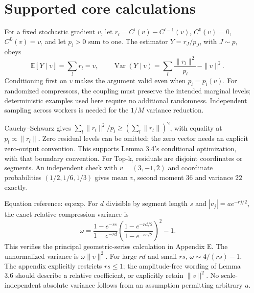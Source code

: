 \documentclass[10pt]{article}
\begin{document}
\section*{Supported core calculations}
For a fixed stochastic gradient \(v\), let \(r_l=C^l(v)-C^{l-1}(v)\), \(C^0(v)=0\), \(C^L(v)=v\), and let \(p_l>0\) sum to one. The estimator \(Y=r_J/p_J\), with \(J\sim p\), obeys \[\mathbb E[Y\mid v]=\sum_l r_l=v,\qquad
 \operatorname{Var}(Y\mid v)=\sum_l\frac{\|r_l\|^2}{p_l}-\|v\|^2.\] Conditioning first on \(v\) makes the argument valid even when \(p_l=p_l(v)\). For randomized compressors, the coupling must preserve the intended marginal levels; deterministic examples used here require no additional randomness. Independent sampling across workers is needed for the \(1/M\) variance reduction.\par
Cauchy–Schwarz gives \(\sum_l\|r_l\|^2/p_l\geq(\sum_l\|r_l\|)^2\), with equality at \(p_l\propto\|r_l\|\). Zero residual levels can be omitted; the zero vector needs an explicit zero-output convention. This supports Lemma 3.4’s conditional optimization, with that boundary convention. For Top-k, residuals are disjoint coordinates or segments. An independent check with \(v=(3,-1,2)\) and coordinate probabilities \((1/2,1/6,1/3)\) gives mean \(v\), second moment \(36\) and variance \(22\) exactly.\par
Equation reference: eq:exp. For \(d\) divisible by segment length \(s\) and \(|v_j|=a e^{-rj/2}\), the exact relative compression variance is \[
 \omega=\frac{1-e^{-rs}}{1-e^{-rd}}
 \left(\frac{1-e^{-rd/2}}{1-e^{-rs/2}}\right)^2-1.\] This verifies the principal geometric-series calculation in Appendix E. The unnormalized variance is \(\omega\|v\|^2\). For large \(rd\) and small \(rs\), \(\omega\sim4/(rs)-1\). The appendix explicitly restricts \(rs\leq1\); the amplitude-free wording of Lemma 3.6 should describe a relative coefficient, or explicitly retain \(\|v\|^2\). No scale-independent absolute variance follows from an assumption permitting arbitrary \(a\).\par
\end{document}
